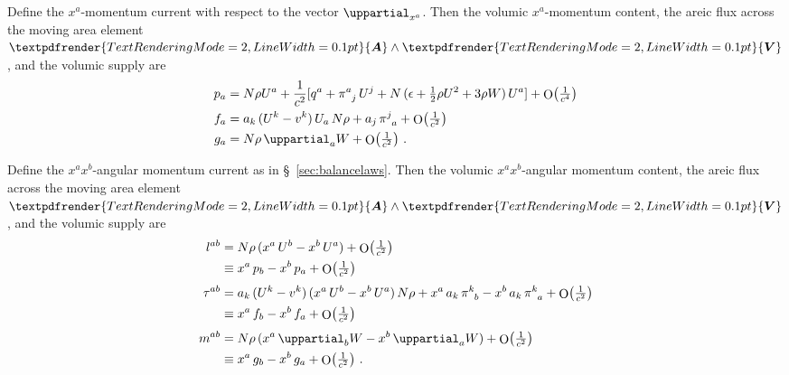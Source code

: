 \documentclass[\ifafour a4paper,12pt,\else a5paper,10pt,\fi%
onecolumn,oneside,article,%
british%
]{memoir}
\theoremstyle{remark}
\theoremstyle{innote}
\renewcommand*{\bm}[1]{\textpdfrender{TextRenderingMode=2,LineWidth=0.1pt}{\boldsymbol{#1}}}
\newcommand*{\de}{\uppartial}%
\DeclareMathOperator{\Ord}{O}%
\renewcommand*{\|}[1][]{\nonscript\:#1\vert\nonscript\:\mathopen{}}
\newcommand*{\sect}{\S}%
\renewcommand*{\i}{{}\indices}
\newcommand*{\se}[1]{\de_{#1}}
\newcommand*{\yW}{W}
\newcommand*{\Oc}[1]{\Ord\bigl(\tfrac{1}{c^{#1}}\bigr)}
\begin{document}
Define the $x^{a}$-momentum current with respect to the vector $\se{x^{a}}$. Then the volumic $x^{a}$-momentum content, the areic flux across the moving area element $\bm{A}\land\bm{V}$, and the volumic supply are
\begin{equation}
  \label{eq:momentum_matter_GCRS}
  \begin{aligned}
    p_{a} &=
    N\rho U^{a} + \frac{1}{c^{2}} [
    q^{a} + \pi\i{^{a}_{j}}\,U^{j} +
    N\,(\epsilon + \tfrac12 \rho U^{2} + 3\rho\yW)\, U^{a}
    ] + \Oc{4}
    \\
    f_{a} &=
    \!\begin{multlined}[t][0.8\linewidth]
      a_{k}\,(U^{k}-v^{k})\,U_{a}\,N\rho + a_{j}\,\pi\i{^{j}_{a}} +
      \Oc{2}
    \end{multlined}
    \\
    g_{a} &= N\rho\,\de_{a}\yW + \Oc{2} \ .
  \end{aligned}
\end{equation}

Define the $x^{a}x^{b}$-angular momentum current as in \sect~\ref{sec:balancelaws}. Then the volumic $x^{a}x^{b}$-angular momentum content, the areic flux across the moving area element $\bm{A}\land\bm{V}$, and the volumic supply are
\begin{equation}
  \label{eq:ang_momentum_matter_GCRS}
  \begin{aligned}
    l^{ab} &=
    N\rho\, (x^{a}\,U^{b} - x^{b}\,U^{a}) + \Oc{2}
    \\
    &\equiv x^{a}\,p_{b} - x^{b}\,p_{a} + \Oc{2}
    \\[\jot]
    \tau^{ab} &=
    \!\begin{multlined}[t][0.8\linewidth]
      a_{k}\,(U^{k}-v^{k}) \, (x^{a}\,U^{b} - x^{b}\,U^{a})\,N\rho +
      x^{a}\,a_{k}\,\pi\i{^{k}_{b}} - x^{b}\,a_{k}\,\pi\i{^{k}_{a}} +
      \Oc{2}
    \end{multlined}
    \\
    &\equiv x^{a}\,f_{b} - x^{b}\,f_{a} + \Oc{2}
    \\[\jot]
    m^{ab} &= N\rho\,(x^{a}\,\de_{b}\yW - x^{b}\,\de_{a}\yW)+ \Oc{2} 
    \\
    &\equiv x^{a}\,g_{b} - x^{b}\,g_{a} + \Oc{2} \ .
  \end{aligned}
\end{equation}
\end{document}

